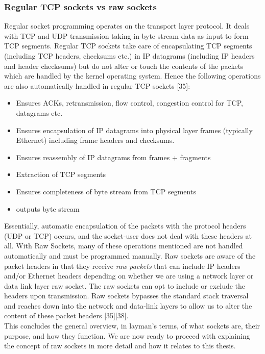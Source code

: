 \documentclass{uathesis}
\begin{document}
\subsubsection{Regular TCP sockets vs raw sockets}
Regular socket programming operates on the transport layer protocol. It deals with TCP and UDP transmission taking in byte stream data as input to form TCP segments. Regular TCP sockets take care of encapsulating TCP segments (including TCP headers, checksums etc.) in IP datagrams (including IP headers and header checksums) but do not alter or touch the contents of the packets which are handled by the kernel operating system. Hence the following operations are also automatically handled in regular TCP sockets [35]:\\

\begin{itemize}
\item Ensures ACKs, retransmission, flow control, congestion control for TCP, datagrams etc.
\item Ensures encapsulation of IP datagrams into physical layer frames (typically Ethernet) including frame headers and checksums.
\item Ensures reassembly of IP datagrams from frames + fragments
\item Extraction of TCP segments
\item Ensures completeness of byte stream from TCP segments
\item outputs byte stream \\
\end{itemize}

Essentially, automatic encapsulation of the packets with the protocol headers (UDP or TCP) occurs, and the socket-user does not deal with these headers at all. With Raw Sockets, many of these operations mentioned are not handled automatically and must be programmed manually. Raw sockets are aware of the packet headers in that they receive \emph{raw packets} that can include IP headers and/or Ethernet headers depending on whether we are using a network layer or data link layer raw socket. The raw sockets can opt to include or exclude the headers upon transmission. Raw sockets bypasses the standard stack traversal and reaches down into the network and data-link layers to allow us to alter the content of these packet headers [35][38].\\

This concludes the general overview, in layman's terms, of what sockets are, their purpose, and how they function.  We are now ready to proceed with explaining the concept of raw sockets in more detail and how it relates to this thesis.\\
\end{document}
